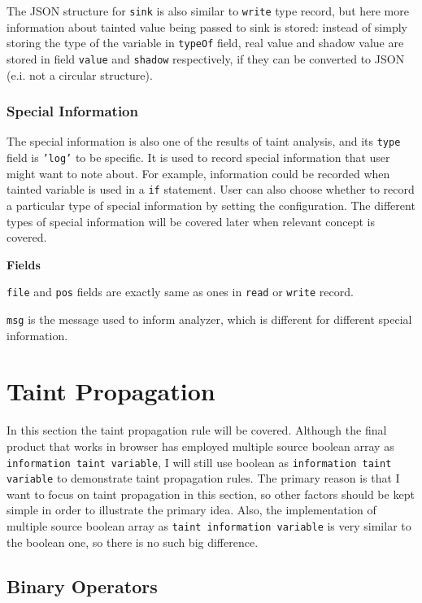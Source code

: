 The JSON structure for \texttt{sink} is also similar to \texttt{write} type record, but here more information about tainted value being passed to sink is stored: instead of simply storing the type of the variable in \texttt{typeOf} field, real value and shadow value are stored in field \texttt{value} and \texttt{shadow} respectively, if they can be converted to JSON (e.i. not a circular structure).

\subsubsection{Special Information}

The special information is also one of the results of taint analysis, and its \texttt{type} field is \texttt{'log'} to be specific. It is used to record special information that user might want to note about. For example, information could be recorded when tainted variable is used in a \texttt{if} statement. User can also choose whether to record a particular type of special information by setting the configuration. The different types of special information will be covered later when relevant concept is covered.

\textbf{Fields}

\texttt{file} and \texttt{pos} fields are exactly same as ones in \texttt{read} or \texttt{write} record.

\texttt{msg} is the message used to inform analyzer, which is different for different special information.

\section{Taint Propagation}

In this section the taint propagation rule will be covered. Although the final product that works in browser has employed multiple source boolean array as \texttt{information taint variable}, I will still use boolean as \texttt{information taint variable} to demonstrate taint propagation rules. The primary reason is that I want to focus on taint propagation in this section, so other factors should be kept simple in order to illustrate the primary idea. Also, the implementation of multiple source boolean array as \texttt{taint information variable} is very similar to the boolean one, so there is no such big difference.  

\subsection{Binary Operators}

